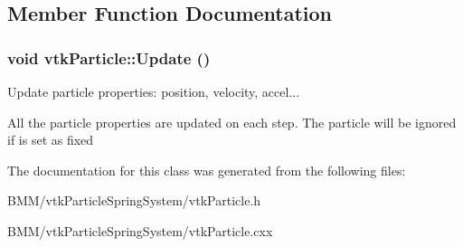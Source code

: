 \subsection{Member Function Documentation}
\hypertarget{classvtkParticle_ae95885babf914d7cbc5f091313cd866b}{
\subsubsection[{Update}]{\setlength{\rightskip}{0pt plus 5cm}void vtkParticle::Update ()}}
\label{classvtkParticle_ae95885babf914d7cbc5f091313cd866b}


Update particle properties: position, velocity, accel... 

All the particle properties are updated on each step. The particle will be ignored if is set as fixed 

The documentation for this class was generated from the following files:\begin{DoxyCompactItemize}
\item 
BMM/vtkParticleSpringSystem/vtkParticle.h\item 
BMM/vtkParticleSpringSystem/vtkParticle.cxx\end{DoxyCompactItemize}
